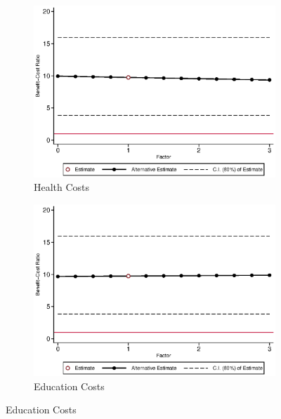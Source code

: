 \begin{figure}[H]
\ContinuedFloat	
	\begin{subfigure}[h]{0.8\textwidth}
	\centering
	\caption{Health Costs} \label{fig:bcrf_health_m1}
	\includegraphics[width=\textwidth]{AppOutput/Sensitivity/bcrf_health_m1.eps}
	\end{subfigure}
	
	\begin{subfigure}[h]{0.8\textwidth}
	\centering
	\caption{Education Costs} \label{fig:bcrf_edu_m1}
	\includegraphics[width=\textwidth]{AppOutput/Sensitivity/bcrf_edu_m1.eps}
	\end{subfigure}
\end{figure}	


